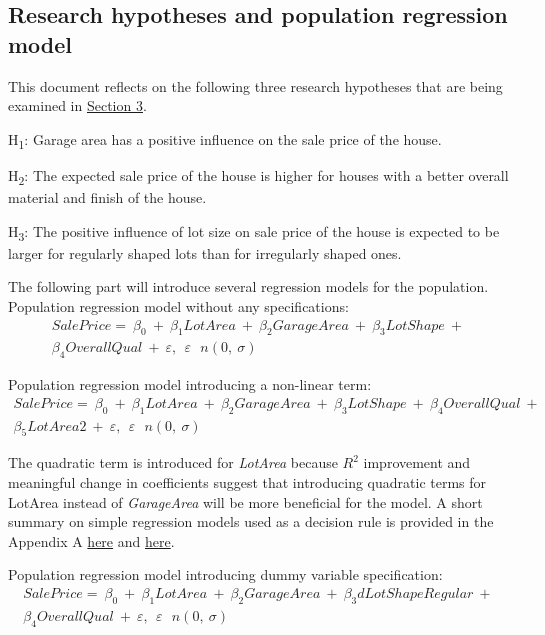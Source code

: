 \documentclass{article}
\begin{document}
\subsection{Research hypotheses and population regression model}
\label{sec:hypotheses}
This document reflects on the following three research hypotheses that are being examined in \hyperref[sec:olsfit]{Section 3}.

H\textsubscript{1}: Garage area has a positive influence on the sale price of the house.

H\textsubscript{2}: The expected sale price of the house is higher for houses with a better overall material and finish of the house.

H\textsubscript{3}: The positive influence of lot size on sale price of the house is expected to be larger for regularly shaped lots than for irregularly shaped ones.

The following part will introduce several regression models for the population. Population regression model without any specifications:
\begin{gather}
SalePrice=\ \beta_0\ +\ \beta_1LotArea\ +\ \beta_2GarageArea\ +\ \beta_3LotShape\ +\ \\ \beta_4OverallQual\ +\ \varepsilon,\ \ \varepsilon\ ~\ n(0,\ \sigma)
\end{gather}

Population regression model introducing a non-linear term:
\begin{gather}
SalePrice=\ \beta_0\ +\ \beta_1LotArea\ +\ \beta_2GarageArea\ +\ \beta_3LotShape\ +\ \beta_4OverallQual\ +\ \\ 
\beta_5LotArea2\ +\ \varepsilon,\ \ \varepsilon\ ~\ n(0,\ \sigma)
\end{gather}

The quadratic term is introduced for \emph{LotArea} because $R^{2}$ improvement and meaningful change in coefficients suggest that introducing quadratic terms for LotArea instead of \emph{GarageArea} will be more beneficial for the model. A short summary on simple regression models used as a decision rule is provided in the Appendix A \hyperref[tab:quadraticlotarea]{here} and \hyperref[tab:quadraticgaragearea]{here}.

Population regression model introducing dummy variable specification:
\begin{gather}
SalePrice=\ \beta_0\ +\ \beta_1LotArea\ +\ \beta_2GarageArea\ +\ \beta_3dLotShapeRegular\ +\ \\ \beta_4OverallQual\ +\ \varepsilon,\ \ \varepsilon\ ~\ n(0,\ \sigma) 
\end{gather}
\end{document}
